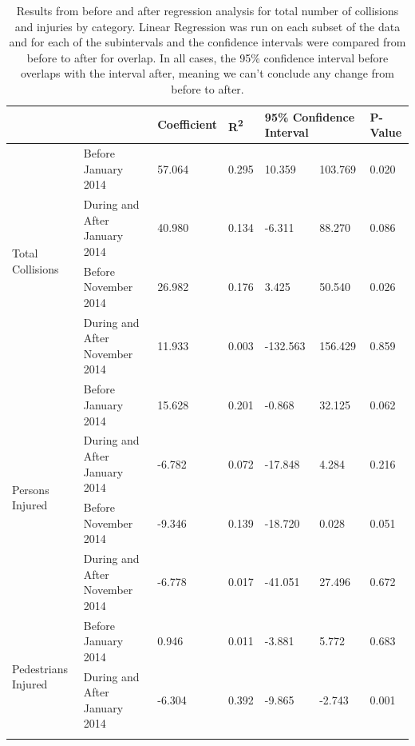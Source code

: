 \documentclass[10pt,journal,compsoc]{IEEEtran}
\begin{document}
\begin{table}[]
\centering
\caption{Results from before and after regression analysis for total number of collisions and injuries by category. Linear Regression was run on each subset of the data and for each of the subintervals and the confidence intervals were compared from before to after for overlap.  In all cases, the 95\% confidence interval before overlaps with the interval after, meaning we can't conclude any change from before to after. }
\label{tab:ana}
\begin{tabular}{|l|l|l|l|l|l|l|}
\hline
                                     &            & Coefficient & R\textsuperscript{2}    & \multicolumn{2}{l|}{95\% Confidence Interval} & P-Value \\ \hline
\multirow{4}{*}{Total Collisions}    & Before January 2014 & 57.064      & 0.295 & 10.359                 & 103.769              & 0.020   \\ \cline{2-7} 
                                     & During and After January 2014  & 40.980      & 0.134 & -6.311                 & 88.270               & 0.086   \\ \cline{2-7} 
                                     & Before November 2014 & 26.982      & 0.176 & 3.425                  & 50.540                & 0.026  \\ \cline{2-7} 
                                     & During and After November 2014  & 11.933      & 0.003 & -132.563               & 156.429              & 0.859   \\ \hline
\multirow{4}{*}{Persons Injured}     & Before January 2014 & 15.628      & 0.201 & -0.868                 & 32.125               & 0.062   \\ \cline{2-7} 
                                     & During and After January 2014  & -6.782      & 0.072 & -17.848                & 4.284                & 0.216   \\ \cline{2-7} 
                                     & Before November 2014 & -9.346      & 0.139 & -18.720                & 0.028                & 0.051   \\ \cline{2-7} 
                                     & During and After November 2014  & -6.778      & 0.017 & -41.051                & 27.496               & 0.672   \\ \hline
\multirow{4}{*}{Pedestrians Injured} & Before January 2014 & 0.946       & 0.011 & -3.881                 & 5.772                & 0.683   \\ \cline{2-7} 
                                     & During and After January 2014  & -6.304      & 0.392 & -9.865                 & -2.743               & 0.001   \\ \cline{2-7} 

\end{tabular}
\end{table}
\end{document}
